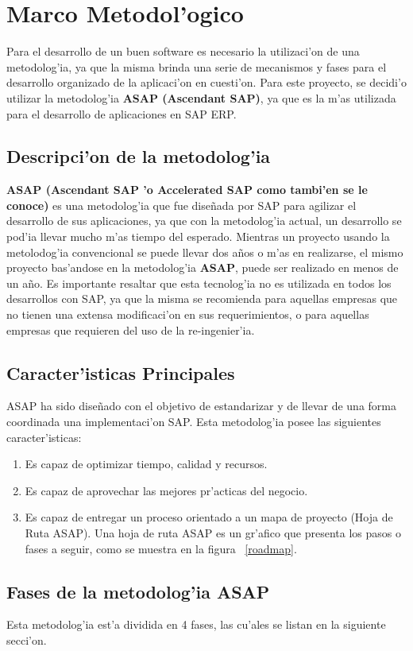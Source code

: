 \chapter{Marco Metodol'ogico} \label{chap:metodologia}
Para el desarrollo de un buen software es necesario la utilizaci'on de una metodolog'ia, ya que la misma brinda una serie de mecanismos y fases para el desarrollo organizado de la aplicaci'on en cuesti'on.
Para este proyecto, se decidi'o utilizar la metodolog'ia \textbf{ASAP (Ascendant SAP)}, ya que es la m'as utilizada para el desarrollo de aplicaciones en SAP ERP.
\section{Descripci'on de la metodolog'ia}
\textbf{ASAP (Ascendant SAP 'o Accelerated SAP como tambi'en se le conoce)} es una metodolog'ia que fue dise\~nada por SAP para agilizar el desarrollo de sus aplicaciones, ya que con la metodolog'ia actual, un desarrollo se pod'ia llevar mucho m'as tiempo del esperado. Mientras un proyecto usando la metolodog'ia convencional se puede llevar dos a\~nos o m'as en realizarse, el mismo proyecto bas'andose en la metodolog'ia \textbf{ASAP}, puede ser realizado en menos de un a\~no. 
Es importante resaltar que esta tecnolog'ia no es utilizada en todos los desarrollos con SAP, ya que la misma se recomienda para aquellas empresas que no tienen una extensa modificaci'on en sus requerimientos, o para aquellas empresas que requieren del uso de la re-ingenier'ia.
\section{Caracter'isticas Principales}
ASAP ha sido dise\~nado con el objetivo de estandarizar y de llevar de una forma coordinada una implementaci'on SAP.  Esta metodolog'ia posee las siguientes caracter'isticas:
\begin{enumerate}
\item Es capaz de optimizar tiempo, calidad y recursos.
\item Es capaz de aprovechar las mejores pr'acticas del negocio.
\item Es capaz de entregar un proceso orientado a un mapa de proyecto (Hoja de Ruta ASAP). Una hoja de ruta ASAP es un gr'afico que presenta los pasos o fases a seguir, como se muestra en la figura ~\ref{roadmap}.

\end{enumerate}

\section{Fases de la metodolog'ia ASAP}
Esta metodolog'ia est'a dividida en 4 fases, las cu'ales se listan en la siguiente secci'on.
